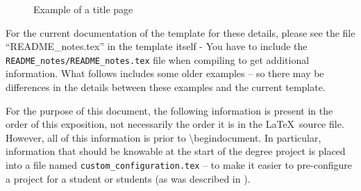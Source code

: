 \begin{figure}[!ht]
  \begin{center}
  \end{center}
  \caption{Example of a title page}
  \label{fig:sampleTitlePage}
\end{figure}
\clearpage

For the current documentation of the template for these details, please see the file “README\_notes.tex” in the template itself - 
{You have to include the \texttt{README\_notes/README\_notes.tex} file when compiling to get additional information.}
What follows includes some older examples – so there may be differences in the details between these examples and the current template.

For the purpose of this document, the following information is present in the order of this exposition, not necessarily the order it is in the \LaTeX~source file. However, all of this information is prior to \textbackslash begin{document}. In particular, information that should be knowable at the start of the degree project is placed into a file named \texttt{custom\_configuration.tex} – to make it easier to pre-configure a project for a student or students (as was described in ).

